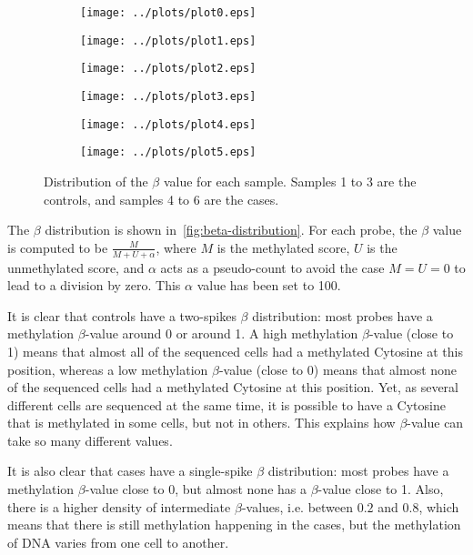 \documentclass{article}
\begin{document}
\begin{figure*}[!t]
	\begin{subfigure}{.33\textwidth}
	\texttt{[image: ../plots/plot0.eps]}
	\end{subfigure}
	\begin{subfigure}{.33\textwidth}
	\texttt{[image: ../plots/plot1.eps]}
	\end{subfigure}
	\begin{subfigure}{.33\textwidth}
	\texttt{[image: ../plots/plot2.eps]}
	\end{subfigure}
	\begin{subfigure}{.33\textwidth}
	\texttt{[image: ../plots/plot3.eps]}
	\end{subfigure}
	\begin{subfigure}{.33\textwidth}
	\texttt{[image: ../plots/plot4.eps]}
	\end{subfigure}
	\begin{subfigure}{.33\textwidth}
	\texttt{[image: ../plots/plot5.eps]}
	\end{subfigure}
	\caption{Distribution of the $\beta$ value for each sample. Samples 1 to 3 are the controls, and samples 4 to 6 are the cases.
	\label{fig:beta-distribution}}
\end{figure*}

The $\beta$ distribution is shown in~\autoref{fig:beta-distribution}. For each probe, the $\beta$ value is computed to be $\frac M{M+U+\alpha}$,
where $M$ is the methylated score, $U$ is the unmethylated score, and $\alpha$ acts as a pseudo-count to avoid the case $M=U=0$ to lead
to a division by zero. This $\alpha$ value has been set to 100.~\cite{du2010comparison}

It is clear that controls have a two-spikes $\beta$ distribution: most probes have a methylation $\beta$-value around 0 or around 1.
A high methylation $\beta$-value (close to 1) means that almost all of the sequenced cells had a methylated Cytosine at this position,
whereas a low methylation $\beta$-value (close to 0) means that almost none of the sequenced cells had a methylated Cytosine at this
position. Yet, as several different cells are sequenced at the same time, it is possible to have a Cytosine that is methylated in
some cells, but not in others. This explains how $\beta$-value can take so many different values.

It is also clear that cases have a single-spike $\beta$ distribution: most probes have a methylation $\beta$-value close to 0,
but almost none has a $\beta$-value close to 1. Also, there is a higher density of intermediate $\beta$-values, i.e. between $0.2$
and $0.8$, which means that there is still methylation happening in the cases, but the methylation of DNA varies from one cell
to another.
\end{document}
